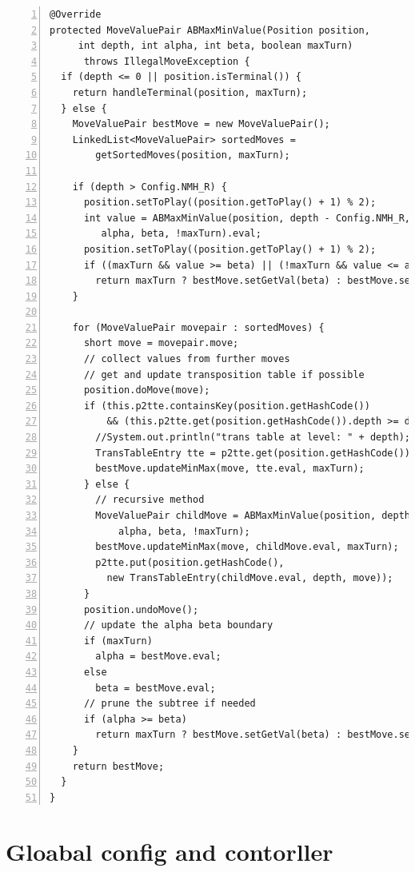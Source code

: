 \documentclass{article}
\begin{document}
\begin{lstlisting}[numbers=left]
@Override
protected MoveValuePair ABMaxMinValue(Position position,
     int depth, int alpha, int beta, boolean maxTurn)
      throws IllegalMoveException {
  if (depth <= 0 || position.isTerminal()) {
    return handleTerminal(position, maxTurn);
  } else {
    MoveValuePair bestMove = new MoveValuePair();
    LinkedList<MoveValuePair> sortedMoves =
        getSortedMoves(position, maxTurn);

    if (depth > Config.NMH_R) {
      position.setToPlay((position.getToPlay() + 1) % 2);
      int value = ABMaxMinValue(position, depth - Config.NMH_R,
         alpha, beta, !maxTurn).eval;
      position.setToPlay((position.getToPlay() + 1) % 2);
      if ((maxTurn && value >= beta) || (!maxTurn && value <= alpha))
        return maxTurn ? bestMove.setGetVal(beta) : bestMove.setGetVal(alpha);
    }

    for (MoveValuePair movepair : sortedMoves) {
      short move = movepair.move;
      // collect values from further moves
      // get and update transposition table if possible
      position.doMove(move);
      if (this.p2tte.containsKey(position.getHashCode())
          && (this.p2tte.get(position.getHashCode()).depth >= depth)) {
        //System.out.println("trans table at level: " + depth);
        TransTableEntry tte = p2tte.get(position.getHashCode());
        bestMove.updateMinMax(move, tte.eval, maxTurn);
      } else {
        // recursive method
        MoveValuePair childMove = ABMaxMinValue(position, depth - 1, 
            alpha, beta, !maxTurn);
        bestMove.updateMinMax(move, childMove.eval, maxTurn);
        p2tte.put(position.getHashCode(),
          new TransTableEntry(childMove.eval, depth, move));
      }
      position.undoMove();
      // update the alpha beta boundary
      if (maxTurn)
        alpha = bestMove.eval;
      else
        beta = bestMove.eval;
      // prune the subtree if needed
      if (alpha >= beta)
        return maxTurn ? bestMove.setGetVal(beta) : bestMove.setGetVal(alpha);
    }
    return bestMove;
  }
}
\end{lstlisting}









\clearpage
\section{Gloabal config and contorller}
\end{document}
